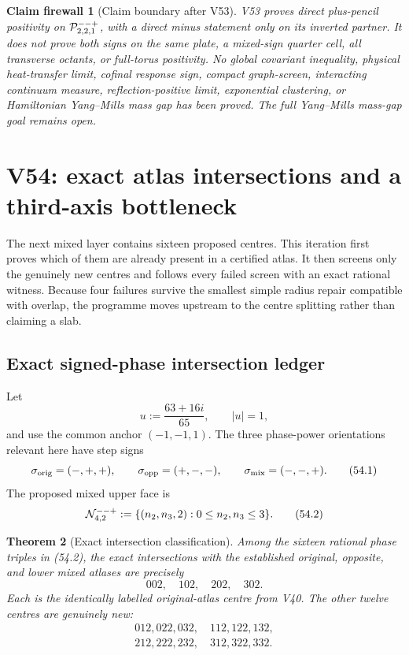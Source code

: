 \documentclass[11pt,oneside]{article}
\newtheorem{theorem}{Theorem}[section]
\newtheorem{firewall}[theorem]{Claim firewall}
\theoremstyle{definition}
\theoremstyle{remark}
\begin{document}
\begin{firewall}[Claim boundary after V53]
\label{fire:newv53-final}
V53 proves direct plus-pencil positivity on
\({\cal P}_{2,2,1}^{--+}\), with a direct minus statement only on
its inverted partner.  It does not prove both signs on the same
plate, a mixed-sign quarter cell, all transverse octants, or
full-torus positivity.  No global covariant inequality, physical
heat-transfer limit, cofinal response sign, compact graph-screen,
interacting continuum measure, reflection-positive limit,
exponential clustering, or Hamiltonian Yang--Mills mass gap has
been proved.  The full Yang--Mills mass-gap goal remains open.
\end{firewall}

\section{V54: exact atlas intersections and a third-axis bottleneck}
\label{sec:newv54-third-axis-bottleneck}

The next mixed layer contains sixteen proposed centres.  This
iteration first proves which of them are already present in a
certified atlas.  It then screens only the genuinely new centres
and follows every failed screen with an exact rational witness.
Because four failures survive the smallest simple radius repair
compatible with overlap, the programme moves upstream to the
centre splitting rather than claiming a slab.

\subsection{Exact signed-phase intersection ledger}

Let
\[
 u:=\frac{63+16i}{65},\qquad |u|=1,
\]
and use the common anchor \((-1,-1,1)\).  The three phase-power
orientations relevant here have step signs
\[
 \sigma_{\rm orig}=(-,+,+),\qquad
 \sigma_{\rm opp}=(+,-,-),\qquad
 \sigma_{\rm mix}=(-,-,+).                            \tag{54.1}
\]
The proposed mixed upper face is
\[
 {\cal N}_{4,2}^{--+}
 :=\{(n_2,n_3,2):0\le n_2,n_3\le3\}.                 \tag{54.2}
\]

\begin{theorem}[Exact intersection classification]
\label{thm:newv54-intersections}
Among the sixteen rational phase triples in (54.2), the exact
intersections with the established original, opposite, and
lower mixed atlases are precisely
\[
 002,\quad102,\quad202,\quad302.                      \tag{54.3}
\]
Each is the identically labelled original-atlas centre from V40.
The other twelve centres are genuinely new:
\[
\begin{gathered}
012,022,032,\quad112,122,132,\\
212,222,232,\quad312,322,332.                         \tag{54.4}
\end{gathered}
\]
\end{theorem}
\end{document}

